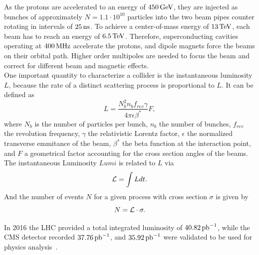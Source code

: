 As the protons are accelerated to an energy of $450\,\text{Ge\hspace{-.08em}V}$, they are injected as bunches of approximately $N=1.1\cdot10^{10}$ particles into the two beam pipes counter rotating in intervals of $25\,\text{ns}$. To achieve a center-of-mass energy of $13\,\text{Te\hspace{-.08em}V}$, each beam has to reach an energy of $6.5\,\text{Te\hspace{-.08em}V}$. Therefore, superconducting cavities operating at $400\,\text{MHz}$ accelerate the protons, and dipole magnets force the beams on their orbital path. Higher order multipoles are needed to focus the beam and correct for different beam and magnetic effects.\\
One important quantity to characterize a collider is the instantaneous luminosity $L$, because the rate of a distinct scattering process is proportional to $L$. It can be defined as
\begin{equation}
 L = \frac{N_{b}^2 n_{b} f_{rev} \gamma} {4\pi \epsilon \beta^{*}}F,
\end{equation}
where $N_b$ is the number of particles per bunch, $n_b$ the number of bunches, $f_{rev}$ the revolution frequency, $\gamma$ the relativistic Lorentz factor, $\epsilon$ the normalized transverse emmitance of the beam, $\beta^{*}$ the beta function at the interaction point, and $F$ a geometrical factor accounting for the cross section angles of the beams. The instantaneous Luminosity $Lumi$ is related to $L$ via
\begin{equation}
 \mathcal{L}= \int L dt.
\end{equation}
And the number of events $N$ for a given process with cross section $\sigma$ is given by
\begin{equation}
 N= \mathcal{L} \cdot \sigma.
\end{equation}

In 2016 the LHC provided a total integrated luminosity of $40.82\mbox{\ensuremath{\,\text{pb}^\text{$-$1}}}$, while the CMS detector recorded $37.76\mbox{\ensuremath{\,\text{pb}^\text{$-$1}}}$, and $35.92\mbox{\ensuremath{\,\text{pb}^\text{$-$1}}}$ were validated to be used for physics analysis~\cite{DataQuality}.





